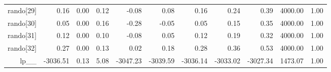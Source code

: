 \begin{table}[ht]
\begin{tabular}{rrrrrrrrrrr}
  rando[29] & 0.16 & 0.00 & 0.12 & -0.08 & 0.08 & 0.16 & 0.24 & 0.39 & 4000.00 & 1.00 \\ 
  rando[30] & 0.05 & 0.00 & 0.16 & -0.28 & -0.05 & 0.05 & 0.15 & 0.35 & 4000.00 & 1.00 \\ 
  rando[31] & 0.12 & 0.00 & 0.10 & -0.08 & 0.05 & 0.12 & 0.19 & 0.32 & 4000.00 & 1.00 \\ 
  rando[32] & 0.27 & 0.00 & 0.13 & 0.02 & 0.18 & 0.28 & 0.36 & 0.53 & 4000.00 & 1.00 \\ 
  lp\_\_ & -3036.51 & 0.13 & 5.08 & -3047.23 & -3039.59 & -3036.14 & -3033.02 & -3027.34 & 1473.07 & 1.00 \\ 
   \hline
\end{tabular}
\label{efit_tab}
\end{table}
